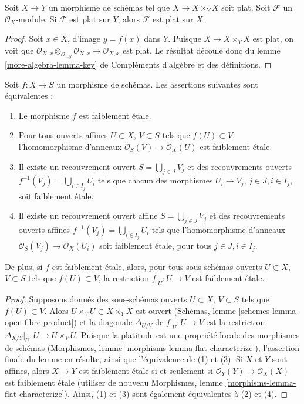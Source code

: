 \begin{lemma}
\label{lemma-key}
Soit $X \to Y$ un morphisme de schémas tel que
$X \to X \times_Y X$ soit plat. Soit $\mathcal{F}$ un $\mathcal{O}_X$-module.
Si $\mathcal{F}$ est plat sur $Y$, alors $\mathcal{F}$ est plat sur $X$.
\end{lemma}

\begin{proof}
Soit $x \in X$, d'image $y = f(x)$ dans $Y$.
Puisque $X \to X \times_Y X$ est plat, on voit que
$\mathcal{O}_{X, x} \otimes_{\mathcal{O}_{Y, y}} \mathcal{O}_{X, x} \to
\mathcal{O}_{X, x}$ est plat. Le résultat découle donc du
lemme \ref{more-algebra-lemma-key} de Compléments d'algèbre
et des définitions.
\end{proof}

\begin{lemma}
\label{lemma-weakly-etale-characterize}
Soit $f : X \to S$ un morphisme de schémas. Les assertions suivantes sont équivalentes :
\begin{enumerate}
\item Le morphisme $f$ est faiblement \'etale.
\item Pour tous ouverts affines $U \subset X$, $V \subset S$
tels que $f(U) \subset V$, l'homomorphisme d'anneaux
$\mathcal{O}_S(V) \to \mathcal{O}_X(U)$ est faiblement \'etale.
\item Il existe un recouvrement ouvert $S = \bigcup_{j \in J} V_j$
et des recouvrements ouverts $f^{-1}(V_j) = \bigcup_{i \in I_j} U_i$ tels
que chacun des morphismes $U_i \to V_j$, $j\in J, i\in I_j$,
soit faiblement \'etale.
\item Il existe un recouvrement ouvert affine $S = \bigcup_{j \in J} V_j$
et des recouvrements ouverts affines $f^{-1}(V_j) = \bigcup_{i \in I_j} U_i$ tels
que l'homomorphisme d'anneaux $\mathcal{O}_S(V_j) \to \mathcal{O}_X(U_i)$ soit
faiblement \'etale, pour tous $j\in J, i\in I_j$.
\end{enumerate}
De plus, si $f$ est faiblement \'etale, alors, pour
tous sous-schémas ouverts $U \subset X$, $V \subset S$ tels que $f(U) \subset V$,
la restriction $f|_U : U \to V$ est faiblement \'etale.
\end{lemma}

\begin{proof}
Supposons donnés des sous-schémas ouverts $U \subset X$, $V \subset S$ tels que
$f(U) \subset V$. Alors $U \times_V U \subset X \times_Y X$ est ouvert
(Schémas, lemme \ref{schemes-lemma-open-fibre-product})
et la diagonale $\Delta_{U/V}$ de $f|_U : U \to V$ est
la restriction $\Delta_{X/Y}|_U : U \to U \times_V U$.
Puisque la platitude est une propriété locale des morphismes de schémas
(Morphismes, lemme \ref{morphisms-lemma-flat-characterize}),
l'assertion finale du lemme en résulte,
ainsi que l'équivalence de (1) et (3).
Si $X$ et $Y$ sont affines, alors $X \to Y$ est faiblement \'etale
si et seulement si $\mathcal{O}_Y(Y) \to \mathcal{O}_X(X)$ est
faiblement \'etale (utiliser de nouveau
Morphismes, lemme \ref{morphisms-lemma-flat-characterize}).
Ainsi, (1) et (3) sont également équivalentes à (2) et (4).
\end{proof}

